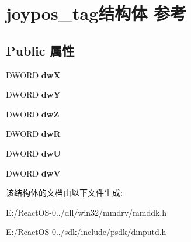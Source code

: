 \hypertarget{structjoypos__tag}{}\section{joypos\+\_\+tag结构体 参考}
\label{structjoypos__tag}
\subsection*{Public 属性}
\begin{DoxyCompactItemize}
\item 
\mbox{\label{structjoypos__tag_a395ee0298bea806dd02589a4e8eedab0}} 
D\+W\+O\+RD {\bfseries dwX}
\item 
\mbox{\label{structjoypos__tag_a0b3dbaa2a709426fb05af5520469d7b3}} 
D\+W\+O\+RD {\bfseries dwY}
\item 
\mbox{\label{structjoypos__tag_a8dd81b8e19d322a1958bb8cf8255de26}} 
D\+W\+O\+RD {\bfseries dwZ}
\item 
\mbox{\label{structjoypos__tag_a1eeadc1156b209e2defbdcc81ec06283}} 
D\+W\+O\+RD {\bfseries dwR}
\item 
\mbox{\label{structjoypos__tag_af9db0efe793ac05a135e701c28983837}} 
D\+W\+O\+RD {\bfseries dwU}
\item 
\mbox{\label{structjoypos__tag_ae2876425e8ff52849d694dbf38a9f2be}} 
D\+W\+O\+RD {\bfseries dwV}
\end{DoxyCompactItemize}


该结构体的文档由以下文件生成\+:\begin{DoxyCompactItemize}
\item 
E\+:/\+React\+O\+S-\/0../dll/win32/mmdrv/mmddk.\+h\item 
E\+:/\+React\+O\+S-\/0../sdk/include/psdk/dinputd.\+h\end{DoxyCompactItemize}
